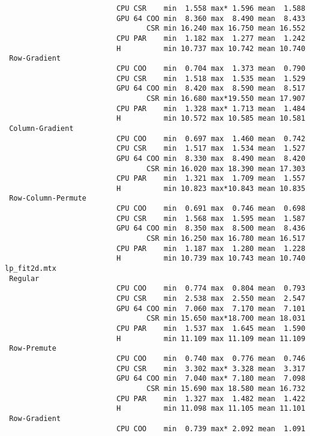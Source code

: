 \begin{verbatim}
                          CPU CSR    min  1.558 max* 1.596 mean  1.588
                          GPU 64 COO min  8.360 max  8.490 mean  8.433
                                 CSR min 16.240 max 16.750 mean 16.552
                          CPU PAR    min  1.182 max  1.277 mean  1.242
                          H          min 10.737 max 10.742 mean 10.740
 Row-Gradient
                          CPU COO    min  0.704 max  1.373 mean  0.790
                          CPU CSR    min  1.518 max  1.535 mean  1.529
                          GPU 64 COO min  8.420 max  8.590 mean  8.517
                                 CSR min 16.680 max*19.550 mean 17.907
                          CPU PAR    min  1.328 max* 1.713 mean  1.484
                          H          min 10.572 max 10.585 mean 10.581
 Column-Gradient
                          CPU COO    min  0.697 max  1.460 mean  0.742
                          CPU CSR    min  1.517 max  1.534 mean  1.527
                          GPU 64 COO min  8.330 max  8.490 mean  8.420
                                 CSR min 16.020 max 18.390 mean 17.303
                          CPU PAR    min  1.321 max  1.709 mean  1.557
                          H          min 10.823 max*10.843 mean 10.835
 Row-Column-Permute
                          CPU COO    min  0.691 max  0.746 mean  0.698
                          CPU CSR    min  1.568 max  1.595 mean  1.587
                          GPU 64 COO min  8.350 max  8.500 mean  8.436
                                 CSR min 16.250 max 16.780 mean 16.517
                          CPU PAR    min  1.187 max  1.280 mean  1.228
                          H          min 10.739 max 10.743 mean 10.740
lp_fit2d.mtx
 Regular
                          CPU COO    min  0.774 max  0.804 mean  0.793
                          CPU CSR    min  2.538 max  2.550 mean  2.547
                          GPU 64 COO min  7.060 max  7.170 mean  7.101
                                 CSR min 15.650 max*18.700 mean 18.031
                          CPU PAR    min  1.537 max  1.645 mean  1.590
                          H          min 11.109 max 11.109 mean 11.109
 Row-Premute
                          CPU COO    min  0.740 max  0.776 mean  0.746
                          CPU CSR    min  3.302 max* 3.328 mean  3.317
                          GPU 64 COO min  7.040 max* 7.180 mean  7.098
                                 CSR min 15.690 max 18.580 mean 16.732
                          CPU PAR    min  1.327 max  1.482 mean  1.422
                          H          min 11.098 max 11.105 mean 11.101
 Row-Gradient
                          CPU COO    min  0.739 max* 2.092 mean  1.091

\end{verbatim}

